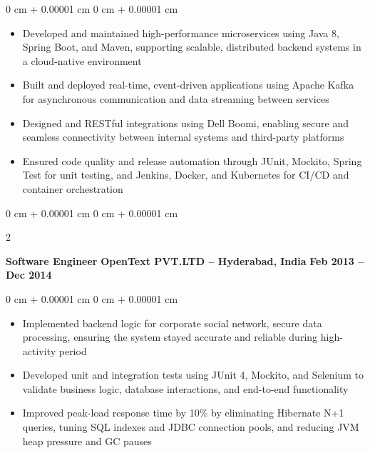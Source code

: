 \documentclass[10pt, letterpaper]{article}
\newenvironment{highlights}{
    \begin{itemize}[
        topsep=0.10 cm,
        parsep=0.10 cm,
        partopsep=0pt,
        itemsep=0pt,
        leftmargin=0 cm + 10pt
    ]
}{
    \end{itemize}
} %
\newenvironment{onecolentry}{
    \begin{adjustwidth}{
        0 cm + 0.00001 cm
    }{
        0 cm + 0.00001 cm
    }
}{
    \end{adjustwidth}
} %
\newenvironment{twocolentry}[2][]{
    \onecolentry
    \def\secondColumn{#2}
    \setcolumnwidth{\fill, 4.5 cm}
    \begin{paracol}{2}
}{
    \switchcolumn \raggedleft \secondColumn
    \end{paracol}
    \endonecolentry
} %
\begin{document}
        \vspace{0.10 cm}
        \begin{onecolentry}
            \begin{highlights}
                \item Developed and maintained high-performance microservices using Java 8, Spring Boot, and Maven, supporting scalable, distributed backend systems in a cloud-native environment
                \item Built and deployed real-time, event-driven applications using Apache Kafka for asynchronous communication and data streaming between services
                \item Designed and RESTful integrations using Dell Boomi, enabling secure and seamless connectivity between internal systems and third-party platforms
                \item Ensured code quality and release automation through JUnit, Mockito, Spring Test for unit testing, and Jenkins, Docker, and Kubernetes for CI/CD and container orchestration

            \end{highlights}
        \end{onecolentry}
        \vspace{0.2 cm}

        \begin{twocolentry}{
            \textbf {Feb 2013 – Dec 2014}
        }
            \textbf{Software Engineer} \hspace{3.2cm}\textbf {OpenText PVT.LTD -- Hyderabad, India}\end{twocolentry}

        \vspace{0.10 cm}
        \begin{onecolentry}
            \begin{highlights}
                \item Implemented backend logic for corporate social network, secure data processing, ensuring the system stayed accurate and reliable during high-activity period
                \item Developed unit and integration tests using JUnit 4, Mockito, and Selenium to validate business logic, database interactions, and end-to-end functionality
                \item Improved peak-load response time by 10\% by eliminating Hibernate N+1 queries, tuning SQL indexes and JDBC connection pools, and reducing JVM heap pressure and GC pauses

            \end{highlights}
        \end{onecolentry}
   
\end{document}
